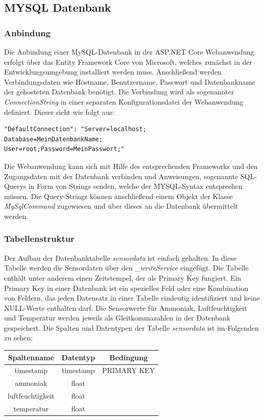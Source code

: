 \documentclass[conference]{IEEEtran}
\begin{document}
\subsection{MYSQL Datenbank}
\subsubsection{Anbindung}
Die Anbindung einer MySQL-Datenbank in der ASP.NET Core Webanwendung erfolgt über das Entity Framework Core von Microsoft, welches zunächst in der Entwicklungsumgebung installiert werden muss. Anschließend werden Verbindungsdaten wie Hostname, Benutzername, Passwort und Datenbankname der gehosteten Datenbank benötigt. Die Verbindung wird als sogenannter \textit{ConnectionString} in einer separaten Konfigurationsdatei der Webanwendung definiert. Dieser sieht wie folgt aus: \\
\begin{verbatim}
"DefaultConnection": "Server=localhost;
Database=MeinDatenbankName;
User=root;Password=MeinPasswort;"
\end{verbatim}
Die Webanwendung kann sich mit Hilfe des entsprechenden Frameworks und den Zugangsdaten mit der Datenbank verbinden und Anweisungen, sogenannte SQL-Querys in Form von Strings senden, welche der MYSQL-Syntax entsprechen müssen. Die Query-Strings können anschließend einem Objekt der Klasse \textit{MySqlCommand} zugewiesen und über dieses an die Datenbank übermittelt werden.
\subsubsection{Tabellenstruktur}
Der Aufbau der Datenbanktabelle \textit{sensordata} ist einfach gehalten. In diese Tabelle werden die Sensordaten über den \textit{\_writeService} eingefügt. Die Tabelle enthält unter anderem einen Zeitstempel, der als Primary Key fungiert. Ein Primary Key in einer Datenbank ist ein spezielles Feld oder eine Kombination von Feldern, das jeden Datensatz in einer Tabelle eindeutig identifiziert und keine NULL-Werte enthalten darf. Die Sensorwerte für Ammoniak, Luftfeuchtigkeit und Temperatur werden jeweils als Gleitkommazahlen in der Datenbank gespeichert. Die Spalten und Datentypen der Tabelle \textit{sensordata} ist im Folgenden zu sehen:
\begin{table}[h!]
    \centering
    \begin{tabular}{|c|c|c|}
        \hline
        \textbf{Spaltenname} & \textbf{Datentyp}  & \textbf{Bedingung} \\
        \hline
        timestamp & timestamp & PRIMARY KEY \\
        \hline
        ammoniak & float & \\
        \hline
        luftfeuchtigkeit & float &  \\
        \hline
        temperatur & float & \\
        \hline
    \end{tabular}
    \label{tab:sensordata}
\end{table}
\end{document}

